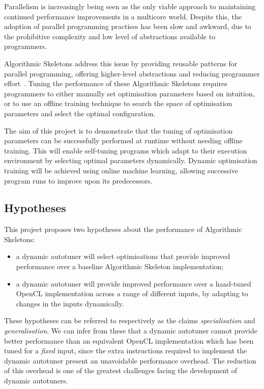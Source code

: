 Parallelism is increasingly being seen as the only viable approach to
maintaining continued performance improvements in a multicore
world. Despite this, the adoption of parallel programming practises
has been slow and awkward, due to the prohibitive complexity and low
level of abstractions available to programmers.

Algorithmic Skeletons address this issue by providing reusable
patterns for parallel programming, offering higher-level abstractions
and reducing programmer effort~\cite{Cole1989, Cole2004}. Tuning the
performance of these Algorithmic Skeletons requires programmers to
either manually set optimisation parameters based on intuition, or to
use an offline training technique to search the space of optimisation
parameters and select the optimal configuration.

The aim of this project is to demonstrate that the tuning of
optimisation parameters can be successfully performed at runtime
without needing offline training. This will enable self-tuning
programs which adapt to their execution environment by selecting
optimal parameters dynamically. Dynamic optimisation training will be
achieved using online machine learning, allowing successive program
runs to improve upon its predecessors.

\subsection{Hypotheses}
This project proposes two hypotheses about the performance of
Algorithmic Skeletons:
\begin{itemize}
\item a dynamic autotuner will select optimisations that provide
  improved performance over a baseline Algorithmic Skeleton
  implementation;
\item a dynamic autotuner will provide improved performance over a
  hand-tuned OpenCL implementation across a range of different inputs,
  by adapting to changes in the inputs dynamically.
\end{itemize}

These hypotheses can be referred to respectively as the claims
\emph{specialisation} and \emph{generalisation}. We can infer from
these that a dynamic autotuner cannot provide better performance than
an equivalent OpenCL implementation which has been tuned for a
\emph{fixed} input, since the extra instructions required to implement
the dynamic autotuner present an unavoidable performance overhead. The
reduction of this overhead is one of the greatest challenges facing
the development of dynamic autotuners.


